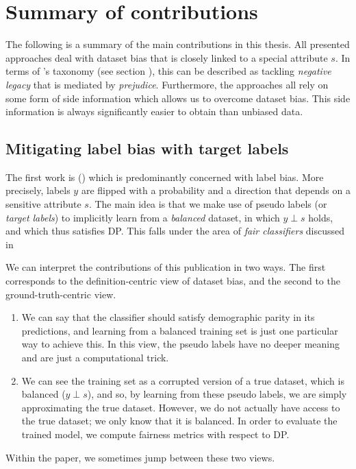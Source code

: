 \chapter{Summary of contributions}\label{ch:content}
The following is a summary of the main contributions in this thesis.
All presented approaches deal with dataset bias that is closely linked to a special attribute $s$.
In terms of \citet{kamishima2012fairness}'s taxonomy (see section ),
this can be described as tackling \emph{negative legacy} that is mediated by \emph{prejudice}.
Furthermore, the approaches all rely on some form of side information which allows us to overcome dataset bias.
This side information is always significantly easier to obtain than unbiased data.


\section{Mitigating label bias with target labels}\label{sec:target-labels}
The first work is \citet{kehrenberg2020tuning} ()
which is predominantly concerned with label bias.
More precisely, labels \(y\) are flipped with a probability and a direction that depends on a sensitive attribute \(s\).
The main idea is that we make use of pseudo labels (or \emph{target labels})
to implicitly learn from a \emph{balanced} dataset,
in which \(y\perp s\) holds, and which thus satisfies \acf{DP}.
This falls under the area of \emph{fair classifiers} discussed in 

We can interpret the contributions of this publication in two ways.
The first corresponds to the definition-centric view of dataset bias,
and the second to the ground-truth-centric view.
\begin{enumerate}
  \item
    We can say that the classifier should satisfy demographic parity in its predictions,
    and learning from a balanced training set is just one particular way to achieve this.
    In this view, the pseudo labels have no deeper meaning and are just a computational trick.
  \item
    We can see the training set as a corrupted version of a true dataset, which is balanced (\(y\perp s\)),
    and so, by learning from these pseudo labels, we are simply approximating the true dataset.
    However, we do not actually have access to the true dataset; we only know that it is balanced.
    In order to evaluate the trained model, we compute fairness metrics with respect to \ac{DP}.
\end{enumerate}
Within the paper, we sometimes jump between these two views.

